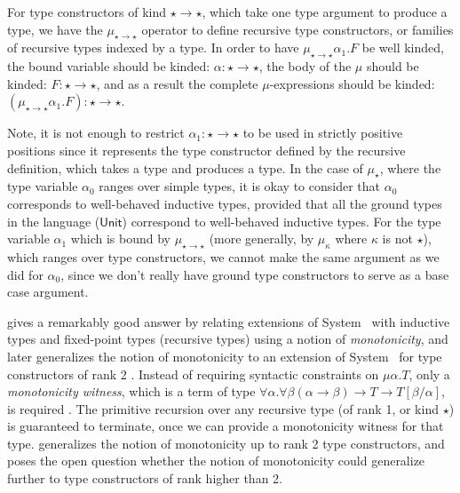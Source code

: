 For type constructors of kind $\star\to\star$, which take one type argument to
produce a type, we have the $\mu_{\star\to\star}$ operator to define recursive
type constructors, or families of recursive types indexed by a type. In order to
have $\mu_{\star\to\star}\alpha_1.F$ be well kinded, the bound variable should
be kinded: $\alpha:\star\to\star$, the body of the $\mu$ should be kinded:
$F:\star\to\star$, and as a result the complete $\mu$-expressions should be
kinded: $(\mu_{\star\to\star}\alpha_1.F):\star\to\star$.

Note, it is not enough to restrict $\alpha_1:\star\to\star$ to be used
in strictly positive positions since it represents the type constructor
defined by the recursive definition, which takes a type and produces a type.
In the case of $\mu_\star$, where the type variable $\alpha_0$ ranges over
simple types, it is okay to consider that $\alpha_0$ corresponds to well-behaved
inductive types, provided that all the ground types in the language 
(\eg $\mathsf{Unit}$) correspond to well-behaved inductive types.
For the type variable $\alpha_1$ which is bound by $\mu_{\star\to\star}$
(more generally, by $\mu_\kappa$ where $\kappa$ is not $\star$), which ranges
over type constructors, we cannot make the same argument as we did for
$\alpha_0$, since we don't really have ground type constructors to serve
as a base case argument.

\citet{Mat99} gives a remarkably good answer by relating extensions of
System \F\ with inductive types and fixed-point types (\ie recursive types)
using a notion of \emph{monotonicity}, and later generalizes the notion of
monotonicity to an extension of System \Fw\ for type constructors of rank 2
\cite{Mat01}. Instead of requiring syntactic constraints on $\mu\alpha.T$,
only a \emph{monotonicity witness}, which is a term of type
$\forall\alpha.\forall\beta(\alpha\to\beta)\to T\to T[\beta/\alpha]$,
is required \cite{Mat99}. The primitive recursion over any recursive type
(of rank 1, or kind $\star$) is guaranteed to terminate, once we can provide
a monotonicity witness for that type. \citet{Mat01} generalizes the
notion of monotonicity up to rank 2 type constructors, and poses the open
question whether the notion of monotonicity could generalize further to
type constructors of rank higher than 2.

